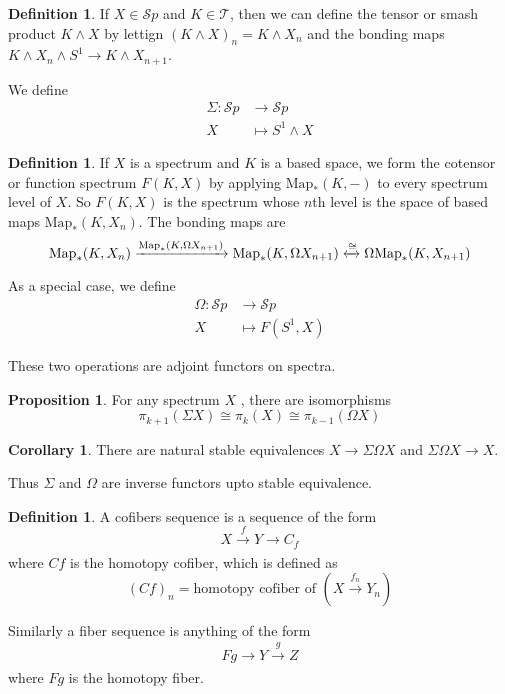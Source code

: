 \documentclass[notitlepage,12pt]{article}
\theoremstyle{definition}
\newtheorem{corollary}[theorem]{Corollary}
\newtheorem{definition}[theorem]{Definition}
\newtheorem{proposition}[theorem]{Proposition}
\theoremstyle{para}{\normalfont}
\begin{document}
\begin{definition}
    If $X\in \mathcal{S}p$ and $K\in \mathcal{T}$, then we can define the tensor or smash product $K\wedge X$ by lettign $(K\wedge X)_n=K\wedge X_n$ and the bonding maps $K\wedge X_n\wedge S^1\to K\wedge X_{n+1 }$. 

We define \begin{align*}
    \Sigma:\mathcal{S}p&\to \mathcal{S}p\\
    X&\mapsto S^1\wedge X
\end{align*}

\end{definition}

\begin{definition}

    If $X$ is a spectrum and $K$ is a based space, we form the cotensor or function spectrum $F(K,X)$ by applying $\mathrm{Map } _*(K,-)$ to every spectrum level of $X$. So $F(K,X)$ is the spectrum whose $n$th level is the space of based maps $\mathrm{ Map } _*(K,X_n)$. The bonding maps are 
    \[
         \mathrm{ Map } _*(K,X_n)\xrightarrow[ ]{\mathrm{ Map } _*(K, \Omega X_{n+1 })}\mathrm{Map } _*(K, \Omega X_{n+1})\xleftrightarrow[]{ \cong }\Omega \mathrm{Map } _*(K,X_{n+1 })
    \]
    
    As a special case, we define 
    \begin{align*}
        \Omega: \mathcal{S}p&\to \mathcal{S}p\\
        X&\mapsto F(S^1,X)
    \end{align*}
\end{definition}

These two operations are adjoint functors on spectra. 

\begin{proposition}
    For any spectrum $X$ , there are isomorphisms 
    \[
        \pi_{k+1 }(\Sigma X)\cong \pi_k(X)\cong \pi_{k-1 }(\Omega X)
    \]
\end{proposition}
\begin{corollary}
    There are natural stable equivalences $X\to \Sigma \Omega X$ and $\Sigma \Omega X\to X$. 
\end{corollary}Thus $\Sigma$ and $\Omega$ are inverse functors upto stable equivalence. 

\begin{definition}
    A cofibers sequence is a sequence of the form 
    \[
        X \xrightarrow[ ]{f }Y\to C_f
    \]where $Cf$ is the homotopy cofiber, which is defined as 
    \[
        (Cf)_n=\text{homotopy cofiber of }(X \xrightarrow[ ]{f_n }Y_n)
    \]

    Similarly a fiber sequence is anything of the form 
    \[
         Fg\to Y \xrightarrow[ ]{g }Z
    \]where $Fg$ is the homotopy fiber. 
\end{definition}
\end{document}
